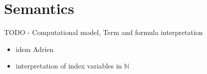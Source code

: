 \section{Semantics}

TODO - Computational model, Term and formula interpretation

\begin{itemize}
  \item idem Adrien
  \item interpretation of index variables in $\mathbb{N}$
\end{itemize}
